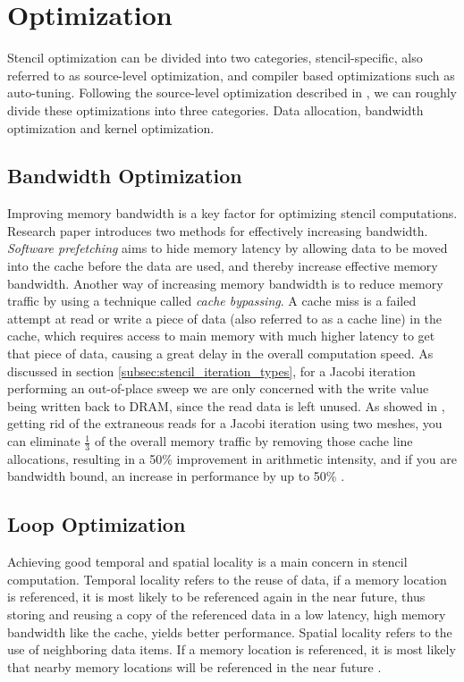 
\section{Optimization}
\label{sec:optimization}
Stencil optimization can be divided into two categories, stencil-specific, also referred to as source-level optimization, and compiler based optimizations such as auto-tuning. Following the source-level optimization described in \cite{article9}, we can roughly divide these optimizations into three categories.  Data allocation, bandwidth optimization and kernel optimization. 

\subsection{Bandwidth Optimization}
Improving memory bandwidth is a key factor for optimizing stencil computations. Research paper \cite{article9} introduces two methods for effectively increasing bandwidth. \textit{Software prefetching} aims to hide memory latency by allowing data to be moved into the cache before the data are used, and thereby increase effective memory bandwidth. Another way of increasing memory bandwidth is to reduce memory traffic by using a technique called \textit{cache bypassing}. A cache miss is a failed attempt at read or write a piece of data (also referred to as a cache line) in the cache, which requires access to main memory with much higher latency to get that piece of data, causing a great delay in the overall computation speed. As discussed in section \ref{subsec:stencil_iteration_types}, for a Jacobi iteration performing an out-of-place sweep we are only concerned with the write value being written back to DRAM, since the read data is left unused. As showed in \cite{article9}, getting rid of the extraneous reads for a Jacobi iteration using two meshes, you can eliminate \(\frac{1}{3}\) of the overall memory traffic by removing those cache line allocations, resulting in a 50\% improvement in arithmetic intensity, and if you are bandwidth bound, an increase in performance by up to 50\% \cite{article9}.

\subsection{Loop Optimization}
Achieving good temporal and spatial locality is a main concern in stencil computation. Temporal locality refers to the reuse of data, if a memory location is referenced, it is most likely to be referenced again in the near future, thus storing and reusing a copy of the referenced data in a low latency, high memory bandwidth like the cache, yields better performance. Spatial locality refers to the use of neighboring data items. If a memory location is referenced, it is most likely that nearby memory locations will be referenced in the near future \cite{article14}.

